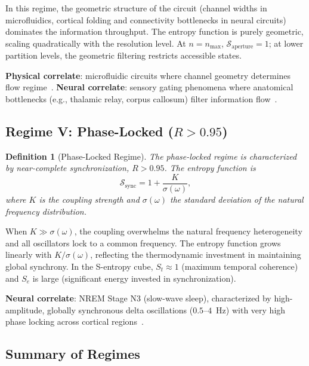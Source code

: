 \documentclass[aps,prd,twocolumn,superscriptaddress,floatfix,nofootinbib]{revtex4-2}
\newtheorem{definition}[theorem]{Definition}
\theoremstyle{remark}
\newcommand{\St}{S_t}
\newcommand{\Se}{S_e}
\newcommand{\Rorder}{R}
\newcommand{\Sregime}{\mathcal{S}}
\begin{document}
In this regime, the geometric structure of the circuit (channel widths in microfluidics, cortical folding and connectivity bottlenecks in neural circuits) dominates the information throughput. The entropy function is purely geometric, scaling quadratically with the resolution level. At $n = n_{\max}$, $\Sregime_{\text{aperture}} = 1$; at lower partition levels, the geometric filtering restricts accessible states.

\textbf{Physical correlate}: microfluidic circuits where channel geometry determines flow regime~\cite{whitesides2006origins,stone2004engineering}. \textbf{Neural correlate}: sensory gating phenomena where anatomical bottlenecks (e.g., thalamic relay, corpus callosum) filter information flow~\cite{bullmore2009complex}.

\subsection{Regime V: Phase-Locked ($\Rorder > 0.95$)}

\begin{definition}[Phase-Locked Regime]
\label{def:phaselocked}
The phase-locked regime is characterized by near-complete synchronization, $\Rorder > 0.95$. The entropy function is
\begin{equation}
    \boxed{\Sregime_{\text{sync}} = 1 + \frac{K}{\sigma(\omega)},}
    \label{eq:s_sync}
\end{equation}
where $K$ is the coupling strength and $\sigma(\omega)$ the standard deviation of the natural frequency distribution.
\end{definition}

When $K \gg \sigma(\omega)$, the coupling overwhelms the natural frequency heterogeneity and all oscillators lock to a common frequency. The entropy function grows linearly with $K/\sigma(\omega)$, reflecting the thermodynamic investment in maintaining global synchrony. In the S-entropy cube, $\St \approx 1$ (maximum temporal coherence) and $\Se$ is large (significant energy invested in synchronization).

\textbf{Neural correlate}: NREM Stage N3 (slow-wave sleep), characterized by high-amplitude, globally synchronous delta oscillations ($0.5$--$4$~Hz) with very high phase locking across cortical regions~\cite{steriade2003neuronal,steriade2006grouping}.

\subsection{Summary of Regimes}
\end{document}
